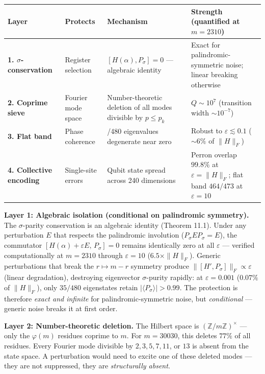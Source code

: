 \documentclass[11pt,letterpaper]{article}
\theoremstyle{definition}
\theoremstyle{remark}
\begin{document}
\begin{longtable}[]{@{}
  >{\raggedright\arraybackslash}p{}
  >{\raggedright\arraybackslash}p{}
  >{\raggedright\arraybackslash}p{}
  >{\raggedright\arraybackslash}p{}@{}}
\toprule
Layer & Protects & Mechanism & Strength (quantified at $m = 2310$) \\
\midrule
\endhead
\bottomrule
\textbf{1. $\sigma$-conservation} & Register selection & $[H(\alpha), P_\sigma] = 0$ --- algebraic identity & Exact for palindromic-symmetric noise; linear breaking otherwise \\
\textbf{2. Coprime sieve} & Fourier mode space & Number-theoretic deletion of all modes divisible by $p \leq p_k$ & $Q \sim 10^7$ (transition width $\sim 10^{-7}$) \\
\textbf{3. Flat band} & Phase coherence & 473/480 eigenvalues degenerate near zero & Robust to $\varepsilon \lesssim 0.1$ ($\sim 6\%$ of $\|H\|_F$) \\
\textbf{4. Collective encoding} & Single-site errors & Qubit state spread across 240 dimensions & Perron overlap $99.8\%$ at $\varepsilon = \|H\|_F$; flat band $464/473$ at $\varepsilon = 10$ \\
\end{longtable}

\textbf{Layer 1: Algebraic isolation (conditional on palindromic symmetry).} The $\sigma$-parity conservation is an algebraic identity (Theorem 11.1). Under any perturbation $E$ that respects the palindromic involution ($P_\sigma E P_\sigma = E$), the commutator $[H(\alpha) + \varepsilon E,\, P_\sigma] = 0$ remains identically zero at all $\varepsilon$ --- verified computationally at $m = 2310$ through $\varepsilon = 10$ ($6.5\times \|H\|_F$). Generic perturbations that break the $r \mapsto m-r$ symmetry produce $\|[H', P_\sigma]\|_F \propto \varepsilon$ (linear degradation), destroying eigenvector $\sigma$-purity rapidly: at $\varepsilon = 0.001$ ($0.07\%$ of $\|H\|_F$), only $35/480$ eigenstates retain $|\langle P_\sigma \rangle| > 0.99$. The protection is therefore \emph{exact and infinite} for palindromic-symmetric noise, but \emph{conditional} --- generic noise breaks it at first order.

\textbf{Layer 2: Number-theoretic deletion.} The Hilbert space is $(\mathbb{Z}/m\mathbb{Z})^\times$ --- only the $\varphi(m)$ residues coprime to $m$. For $m = 30030$, this deletes $77\%$ of all residues. Every Fourier mode divisible by $2, 3, 5, 7, 11$, or $13$ is absent from the state space. A perturbation would need to excite one of these deleted modes --- they are not suppressed, they are \emph{structurally absent}.
\end{document}
